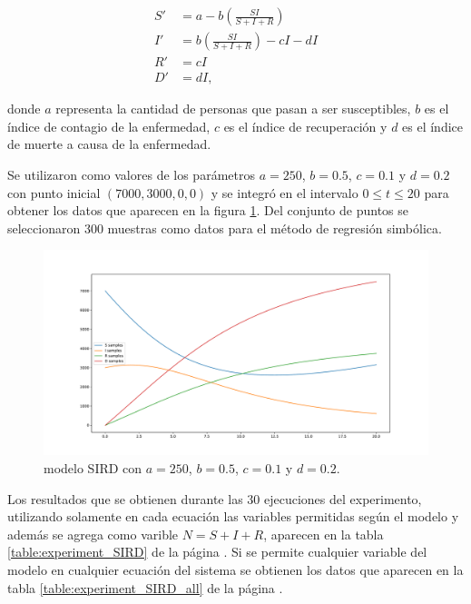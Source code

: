 \begin{align*}
    S' & = a - b (\frac{S I}{S + I + R})         \\
    I' & = b (\frac{S I}{S + I + R}) - c I - d I \\
    R' & = c I                                   \\
    D' & = d I,
\end{align*}

donde $a$ representa la cantidad de personas que pasan a ser susceptibles, $b$ es el índice de contagio de la enfermedad, $c$ es el índice de recuperación y $d$ es el índice de muerte a causa de la enfermedad.

Se utilizaron como valores de los parámetros $a = 250$, $b = 0.5$, $c = 0.1$ y $d = 0.2$ con punto inicial $(7000, 3000, 0, 0)$ y se integró en el intervalo $0 \leq t \leq 20$ para obtener los datos que aparecen en la figura \ref{fig:SIRD}. Del conjunto de puntos se seleccionaron 300 muestras como datos para el método de regresión simbólica.

\begin{figure}[h]
    \centering
    \includegraphics[width=\textwidth]{"figures/SIRD.pdf"}
    \caption{modelo SIRD con $a = 250$, $b = 0.5$, $c = 0.1$ y $d = 0.2$.}
    \label{fig:SIRD}
\end{figure}

Los resultados que se obtienen durante las 30 ejecuciones del experimento, utilizando solamente en cada ecuación las variables permitidas según el modelo y además se agrega como varible $N=S + I + R$, aparecen en la tabla \ref{table:experiment_SIRD} de la página \pageref{table:experiment_SIRD}. Si se permite cualquier variable del modelo en cualquier ecuación del sistema se obtienen los datos que aparecen en la tabla \ref{table:experiment_SIRD_all} de la página \pageref{table:experiment_SIRD_all}.

